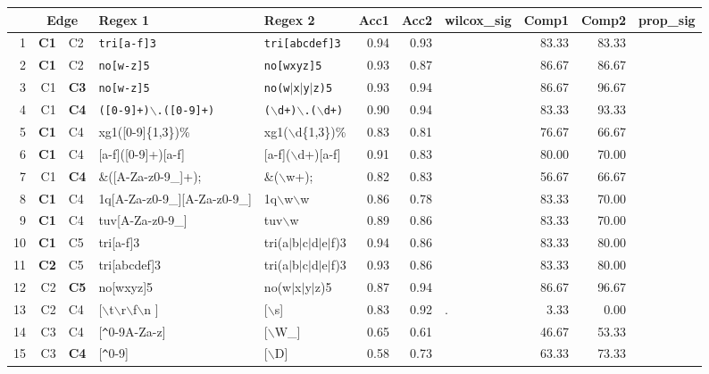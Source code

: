 \begin{table*}[ht]
\centering
\begin{tabular}{rr@{ -- }lllrrlrrl}
  \hline
 & \multicolumn{2}{c}{Edge} & Regex 1 & Regex 2 & Acc1 & Acc2 & wilcox\_sig & Comp1 & Comp2 & prop\_sig \\ 
  \hline
1 & {\bf C1} & C2 & {\tt tri[a-f]3} & {\tt tri[abcdef]3} & 0.94 & 0.93 &   & 83.33 & 83.33 &   \\ 
  2 & {\bf C1} & C2 & {\tt no[w-z]5} & {\tt no[wxyz]5} & 0.93 & 0.87 &   & 86.67 & 86.67 &   \\ 
  3 & C1 & {\bf C3} & {\tt no[w-z]5} & {\tt no(w$|$x$|$y$|$z)5} & 0.93 & 0.94 &   & 86.67 & 96.67 &   \\ 
  4 & C1 & {\bf C4} & {\tt ([0-9]+)$\backslash$.([0-9]+)} & {\tt ($\backslash$d+)$\backslash$.($\backslash$d+)} & 0.90 & 0.94 &   & 83.33 & 93.33 &   \\ 
  5 & {\bf C1} & C4 & xg1([0-9]\{1,3\})\% & xg1($\backslash$d\{1,3\})\% & 0.83 & 0.81 &   & 76.67 & 66.67 &   \\ 
  6 & {\bf C1} & C4 & [a-f]([0-9]+)[a-f] & [a-f]($\backslash$d+)[a-f] & 0.91 & 0.83 &   & 80.00 & 70.00 &   \\ 
  7 & C1 & {\bf C4} & \&([A-Za-z0-9\_]+); & \&($\backslash$w+); & 0.82 & 0.83 &   & 56.67 & 66.67 &   \\ 
  8 & {\bf C1} & C4 & 1q[A-Za-z0-9\_][A-Za-z0-9\_] & 1q$\backslash$w$\backslash$w & 0.86 & 0.78 &   & 83.33 & 70.00 &   \\ 
  9 & {\bf C1} & C4 & tuv[A-Za-z0-9\_] & tuv$\backslash$w & 0.89 & 0.86 &   & 83.33 & 70.00 &   \\ 
    10 & {\bf C1} & C5 & tri[a-f]3 & tri(a$|$b$|$c$|$d$|$e$|$f)3 & 0.94 & 0.86 &   & 83.33 & 80.00 &   \\ 
  11 & {\bf C2} & C5 & tri[abcdef]3 & tri(a$|$b$|$c$|$d$|$e$|$f)3 & 0.93 & 0.86 &   & 83.33 & 80.00 &   \\ 
  12 & C2 & {\bf C5} & no[wxyz]5 & no(w$|$x$|$y$|$z)5 & 0.87 & 0.94 &   & 86.67 & 96.67 &   \\ 
  13 & C2 & C4 & [$\backslash$t$\backslash$r$\backslash$f$\backslash$n ] & [$\backslash$s] & 0.83 & 0.92 & . & 3.33 & 0.00 &   \\ 
  14 & C3 & C4 & [\verb|^|0-9A-Za-z] & [$\backslash$W\_] & 0.65 & 0.61 &   & 46.67 & 53.33 &   \\ 
  15 & C3 & {\bf C4} & [\verb|^|0-9] & [$\backslash$D] & 0.58 & 0.73 &   & 63.33 & 73.33 &   \\ 

\end{tabular}
\end{table*}
